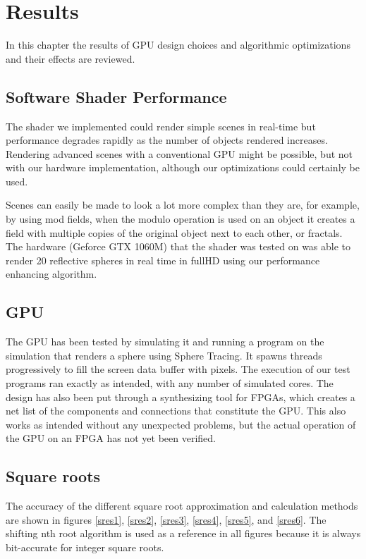 \chapter{Results}

	In this chapter the results of GPU design choices and algorithmic
	optimizations and their effects are reviewed.

	\section{Software Shader Performance}

		The shader we implemented could render simple scenes in real-time but
		performance degrades rapidly as the number of objects rendered increases.
		Rendering advanced scenes with a conventional GPU might be possible, but 
		not with our hardware implementation, although our optimizations could certainly
		be used.

		Scenes can easily be made to look a lot more complex than they
		are, for example, by using mod fields, when the modulo
		operation is used on an object it creates a field with multiple copies
		of the original object next to each other, or fractals. The hardware
		(Geforce GTX 1060M) that the shader was tested on was able to render 20
		reflective spheres in real time in fullHD using our performance
		enhancing algorithm.
 
	\section{GPU}
	
		The GPU has been tested by simulating it and running a program on the simulation 
		that renders a sphere using Sphere Tracing. It spawns threads
		progressively to fill the screen data buffer with pixels. The execution
		of our test programs ran exactly as intended, with any number of
		simulated cores. The design has also been put through a synthesizing
		tool for FPGAs, which creates a net list of the components and
		connections that constitute the GPU. This also works as intended
		without any unexpected problems, but the actual operation of the GPU on
		an FPGA has not yet been verified.
	
	\section{Square roots}
		
		The accuracy of the different square root approximation and calculation
		methods are shown in figures \ref{sres1}, \ref{sres2}, \ref{sres3},
		\ref{sres4}, \ref{sres5}, and \ref{sres6}. The shifting nth root
		algorithm is used as a reference in all figures because it is always
		bit-accurate for integer square roots.

